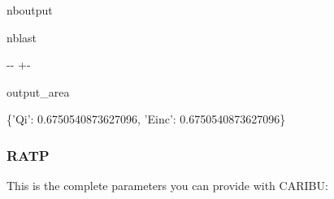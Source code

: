 \documentclass[letterpaper,10pt,english]{sphinxmanual}
\begin{document}
\begin{sphinxuseclass}{nboutput}
\begin{sphinxuseclass}{nblast}
{

\kern-\sphinxverbatimsmallskipamount\kern-\baselineskip
\kern+\FrameHeightAdjust\kern-\fboxrule
\vspace{\nbsphinxcodecellspacing}

\begin{sphinxuseclass}{output_area}
\begin{sphinxuseclass}{}


\begin{sphinxVerbatim}[commandchars=\\\{\}]
\{'Qi': 0.6750540873627096, 'Einc': 0.6750540873627096\}
\end{sphinxVerbatim}



\end{sphinxuseclass}
\end{sphinxuseclass}
}

\end{sphinxuseclass}
\end{sphinxuseclass}

\subsubsection{RATP}
\label{\detokenize{lightmodels_functionnalities:RATP}}
\sphinxAtStartPar
This is the complete parameters you can provide with CARIBU:
\end{document}
